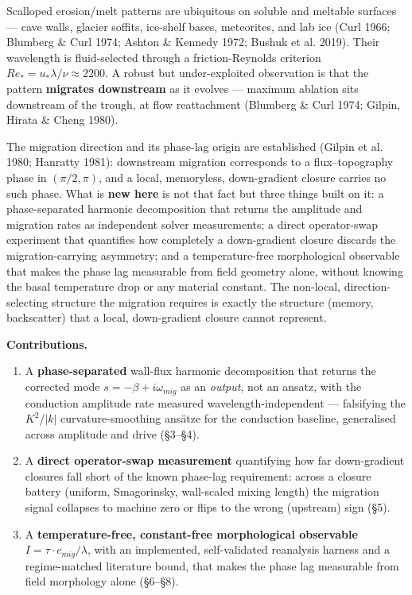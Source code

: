 \documentclass[tc, manuscript]{copernicus}
\begin{document}
\introduction

Scalloped erosion/melt patterns are ubiquitous on soluble and meltable surfaces — cave walls, glacier soffits, ice-shelf bases, meteorites, and lab ice (Curl 1966; Blumberg \& Curl 1974; Ashton \& Kennedy 1972; Bushuk et al. 2019). Their wavelength is fluid-selected through a friction-Reynolds criterion $Re_*=u_*\lambda /\nu \approx 2200$. A robust but under-exploited observation is that the pattern \textbf{migrates downstream} as it evolves — maximum ablation sits downstream of the trough, at flow reattachment (Blumberg \& Curl 1974; Gilpin, Hirata \& Cheng 1980).

The migration direction and its phase-lag origin are established (Gilpin et al. 1980; Hanratty 1981): downstream migration corresponds to a flux–topography phase in $(\pi /2,\pi )$, and a local, memoryless, down-gradient closure carries no such phase. What is \textbf{new here} is not that fact but three things built on it: a phase-separated harmonic decomposition that returns the amplitude and migration rates as independent solver measurements; a direct operator-swap experiment that quantifies how completely a down-gradient closure discards the migration-carrying asymmetry; and a temperature-free morphological observable that makes the phase lag measurable from field geometry alone, without knowing the basal temperature drop or any material constant. The non-local, direction-selecting structure the migration requires is exactly the structure (memory, backscatter) that a local, down-gradient closure cannot represent.

\textbf{Contributions.}

\begin{enumerate}
\item A \textbf{phase-separated} wall-flux harmonic decomposition that returns the corrected mode $s=-\beta +i\omega _{mig}$ as an \emph{output}, not an ansatz, with the conduction amplitude rate measured wavelength-independent — falsifying the $K^{2}$/$|k|$ curvature-smoothing ansätze for the conduction baseline, generalised across amplitude and drive (§3–§4).
\item A \textbf{direct operator-swap measurement} quantifying how far down-gradient closures fall short of the known phase-lag requirement: across a closure battery (uniform, Smagorinsky, wall-scaled mixing length) the migration signal collapses to machine zero or flips to the wrong (upstream) sign (§5).
\item A \textbf{temperature-free, constant-free morphological observable} $I=\tau \cdot c_{mig}/\lambda $, with an implemented, self-validated reanalysis harness and a regime-matched literature bound, that makes the phase lag measurable from field morphology alone (§6–§8).
\end{enumerate}
\end{document}
